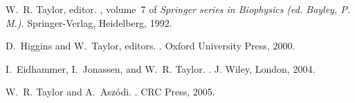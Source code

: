 
W.~R. Taylor, editor.
, volume~7 of {\em
  Springer series in Biophysics (ed. Bayley, P. M.)}.
\newblock Springer-Verlag, Heidelberg, 1992.

D.~Higgins and W.~Taylor, editors.
.
\newblock Oxford University Press, 2000.

I.~Eidhammer, I.~Jonassen, and W.~R. Taylor.
.
\newblock J. Wiley, London, 2004.

W.~R. Taylor and A.~Asz\'odi.
.
\newblock CRC Press, 2005.
